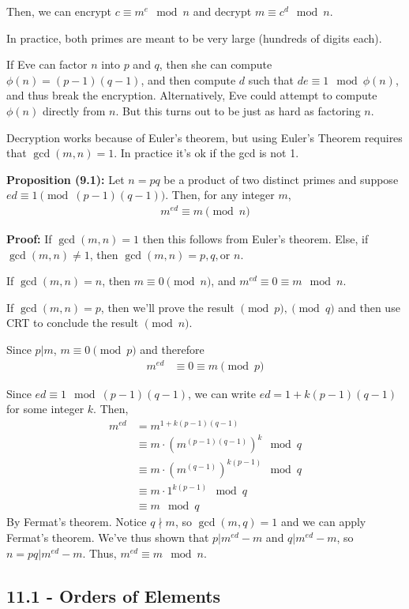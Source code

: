 \documentclass{article}
\begin{document}
Then, we can encrypt $c\equiv m^e\mod n$ and decrypt $m\equiv c^d\mod n$.

In practice, both primes are meant to be very large (hundreds of digits each). 

If Eve can factor $n$ into $p$ and $q$, then she can compute $\phi(n)=(p-1)(q-1)$, and then compute $d$ such that $de\equiv 1\mod \phi(n)$, and thus break the encryption. Alternatively, Eve could attempt to compute $\phi(n)$ directly from $n$. But this turns out to be just as hard as factoring $n$. 

Decryption works because of Euler's theorem, but using Euler's Theorem requires that $\gcd(m,n)=1$. In practice it's ok if the gcd is not 1. 

\textbf{Proposition (9.1):} Let $n=pq$ be a product of two distinct primes and suppose $ed\equiv 1\pmod{(p-1)(q-1)}$. Then, for any integer $m$, \begin{align*}
    m^{ed}\equiv m\pmod n
\end{align*}

\textbf{Proof:} If $\gcd(m,n)=1$ then this follows from Euler's theorem. Else, if $\gcd(m,n)\neq 1$, then $\gcd(m,n)=p,q,\text{or }n$. 

If $\gcd(m,n)=n$, then $m\equiv 0\pmod n$, and $m^{ed}\equiv 0\equiv m\mod n$.

If $\gcd(m,n)=p$, then we'll prove the result $\pmod p, \pmod q$ and then use CRT to conclude the result $\pmod n$.

Since $p|m$, $m\equiv 0\pmod p$ and therefore \begin{align*}
    m^{ed}&\equiv 0\equiv m\pmod p
\end{align*}

Since $ed\equiv 1\mod (p-1)(q-1)$, we can write $ed=1+k(p-1)(q-1)$ for some integer $k$. Then, \begin{align*}
    m^{ed}&=m^{1+k(p-1)(q-1)}\\
    &\equiv m\cdot (m^{(p-1)(q-1)})^k\mod q\\
    &\equiv m\cdot (m^{(q-1)})^{k(p-1)}\mod q\\
    &\equiv m\cdot 1^{k(p-1)}\mod q\\
    &\equiv m\mod q
\end{align*}By Fermat's theorem. Notice $q\nmid m$, so $\gcd(m,q)=1$ and we can apply Fermat's theorem. We've thus shown that $p| m^{ed}-m$ and $q|m^{ed}-m$, so $n=pq|m^{ed}-m$. Thus, $m^{ed}\equiv m\mod n$.

\subsection{11.1 - Orders of Elements}
\end{document}
